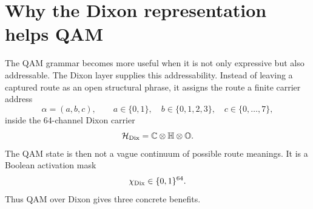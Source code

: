 \providecommand{\HsSix}{}
\renewcommand{\HsSix}{\mathcal H^{(6)}_{64}}
\providecommand{\HaloOp}{}
\renewcommand{\HaloOp}{\mathsf{Halo}}
\providecommand{\ExitOp}{}
\renewcommand{\ExitOp}{\mathsf{Exit}}
\providecommand{\Atlas}{}
\renewcommand{\Atlas}{\mathfrak A}
\providecommand{\Rop}{}
\renewcommand{\Rop}{\mathcal R_{\OP 5}^{\adm,\near K}}
\providecommand{\Lunr}{}
\renewcommand{\Lunr}{L_{\unr}}
\providecommand{\Bhcmm}{}
\renewcommand{\Bhcmm}{B_{\HC/\MM}}
\providecommand{\XD}{}
\renewcommand{\XD}{\Xi_{\Dix}}
\providecommand{\ChiD}{}
\renewcommand{\ChiD}{\chi_{\Dix}}
\providecommand{\Aset}{}
\renewcommand{\Aset}{A_{\mathrm{loc}}}
\providecommand{\Iset}{}
\renewcommand{\Iset}{\mathcal I}
\providecommand{\Mclass}{}
\renewcommand{\Mclass}{\mathfrak M}



\begin{abstract}
This delta layer executes the image audit requested after the local pass. The layer mapped captured near-kernel OP5 routes into the HS(6) Dixon carrier \(\C\otimes\Hh\otimes\Oo\), with 64 real carrier channels and a \(2^{64}\)-state Boolean activation-mask space. The present layer audits only the masks actually reachable from the capture table. It classifies the symbolic image of \(\Xi_{\Dix}^{\mathrm{loc}}\) into blocked, HC/MM absorbed, atlas routed, Dixon-admissible, and residual-open classes. Under the inherited zero leakage/debt assumptions, the declared sample image has no residual-open Dixon-mask class. This remains a conditional local OP5 closure audit inside the declared photon-frame HC-halo and HS(0)--HS(6) grammar, not a global OP5 proof outside that grammar.
\end{abstract}

\section{Why the Dixon representation helps QAM}

The QAM grammar becomes more useful when it is not only expressive but also addressable. The Dixon layer supplies this addressability. Instead of leaving a captured route as an open structural phrase, it assigns the route a finite carrier address
\[
\alpha=(a,b,c),
\qquad
 a\in\{0,1\},\quad b\in\{0,1,2,3\},\quad c\in\{0,\ldots,7\},
\]
inside the 64-channel Dixon carrier
\[
\mathcal H_{\mathrm{Dix}}=\mathbb C\otimes\mathbb H\otimes\mathbb O.
\]
The QAM state is then not a vague continuum of possible route meanings. It is a Boolean activation mask
\[
\ChiD\in\{0,1\}^{64}.
\]
Thus QAM over Dixon gives three concrete benefits.

